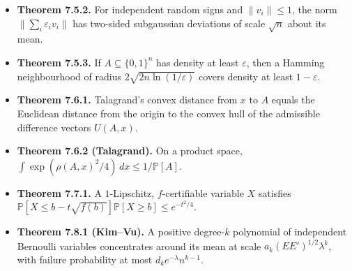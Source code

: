 \documentclass[10pt]{article}
\newcommand{\Prb}{\mathbb P}
\newcommand{\1}{\mathbf 1}
\begin{document}
\begin{itemize}
\item \textbf{Theorem 7.5.2.} For independent random signs and
$\|v_i\|\leq1$, the norm $\|\sum_i\varepsilon_i v_i\|$ has two-sided
subgaussian deviations of scale $\sqrt n$ about its mean.
\item \textbf{Theorem 7.5.3.} If $A\subseteq\{0,1\}^n$ has density at least
$\varepsilon$, then a Hamming neighbourhood of radius
$2\sqrt{2n\ln(1/\varepsilon)}$ covers density at least $1-\varepsilon$.
\item \textbf{Theorem 7.6.1.} Talagrand's convex distance from $x$ to $A$
equals the Euclidean distance from the origin to the convex hull of the
admissible difference vectors $U(A,x)$.
\item \textbf{Theorem 7.6.2 (Talagrand).} On a product space,
$\int\exp(\rho(A,x)^2/4)\,dx\leq1/\Prb[A]$.
\item \textbf{Theorem 7.7.1.} A $1$-Lipschitz, $f$-certifiable variable $X$
satisfies
$\Prb[X\leq b-t\sqrt{f(b)}]\Prb[X\geq b]\leq e^{-t^2/4}$.
\item \textbf{Theorem 7.8.1 (Kim--Vu).} A positive degree-$k$ polynomial of
independent Bernoulli variables concentrates around its mean at scale
$a_k(EE')^{1/2}\lambda^k$, with failure probability at most
$d_ke^{-\lambda}n^{k-1}$.
\end{itemize}
\end{document}
